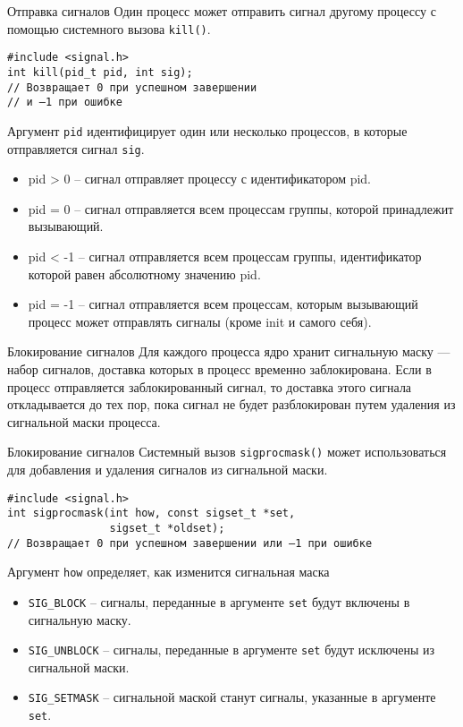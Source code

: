 \documentclass{beamer}
\begin{document}
\begin{frame}[fragile]{Отправка сигналов}
    Один процесс может отправить сигнал другому процессу с помощью системного вызова \texttt{kill()}.

\begin{verbatim}
#include <signal.h>
int kill(pid_t pid, int sig);
// Возвращает 0 при успешном завершении 
// и –1 при ошибке
\end{verbatim}

    Аргумент \texttt{pid} идентифицирует один или несколько процессов, в которые отправляется сигнал \texttt{sig}.
    \begin{itemize}
        \item pid > 0 -- сигнал отправляет процессу с идентификатором pid.
        \item pid = 0 -- сигнал отправляется всем процессам группы, которой принадлежит вызывающий.
        \item pid < -1 -- сигнал отправляется всем процессам группы, идентификатор которой равен абсолютному значению pid.
        \item pid = -1 -- сигнал отправляется всем процессам, которым вызывающий процесс может отправлять сигналы (кроме init и самого себя).
    \end{itemize}
\end{frame}

\begin{frame}{Блокирование сигналов}
    Для каждого процесса ядро хранит сигнальную маску — набор сигналов, доставка которых в процесс временно заблокирована. Если в процесс отправляется заблокированный сигнал, то доставка этого сигнала откладывается до тех пор, пока сигнал не будет разблокирован путем удаления из сигнальной маски процесса. 
\end{frame}

\begin{frame}[fragile]{Блокирование сигналов}
    Системный вызов \texttt{sigprocmask()} может использоваться для добавления и удаления сигналов из сигнальной маски.
\begin{verbatim}
#include <signal.h>
int sigprocmask(int how, const sigset_t *set, 
                sigset_t *oldset);
// Возвращает 0 при успешном завершении или –1 при ошибке
\end{verbatim}
    Аргумент \texttt{how} определяет, как изменится сигнальная маска
    \begin{itemize}
        \item \texttt{SIG\_BLOCK} -- сигналы, переданные в аргументе \texttt{set} будут включены в сигнальную маску.
        \item \texttt{SIG\_UNBLOCK} -- сигналы, переданные в аргументе \texttt{set} будут исключены из сигнальной маски.
        \item \texttt{SIG\_SETMASK} -- сигнальной маской станут сигналы, указанные в аргументе \texttt{set}.
    \end{itemize}
\end{frame}
\end{document}
